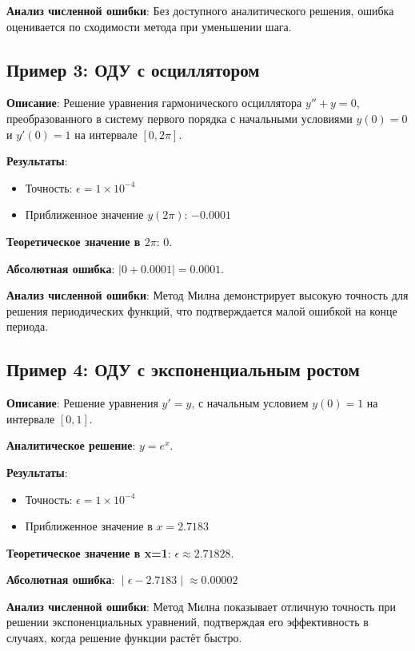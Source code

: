 \textbf{Анализ численной ошибки}: Без доступного аналитического решения, ошибка оценивается по сходимости метода при уменьшении шага.

\subsection{Пример 3: ОДУ с осциллятором}

\textbf{Описание}: Решение уравнения гармонического осциллятора \(y'' + y = 0\), преобразованного в систему первого порядка с начальными условиями \(y(0) = 0\) и \(y'(0) = 1\) на интервале \([0, 2\pi]\).

\textbf{Результаты}:
\begin{itemize}
    \item Точность: \(\epsilon = 1 \times 10^{-4}\)
    \item Приближенное значение \(y(2\pi)\): \(-0.0001\)
\end{itemize}

\textbf{Теоретическое значение в \(2\pi\)}: 0.

\textbf{Абсолютная ошибка}: \(|0 + 0.0001| = 0.0001\).

\textbf{Анализ численной ошибки}: Метод Милна демонстрирует высокую точность для решения периодических функций, что подтверждается малой ошибкой на конце периода.

\subsection{Пример 4: ОДУ с экспоненциальным ростом}

\textbf{Описание}: Решение уравнения $y′=y$, с начальным условием $y(0)=1$ на интервале $[0,1]$.

\textbf{Аналитическое решение}: $y=e^x$.

\textbf{Результаты}:
\begin{itemize}
\item Точность: $ϵ=1×10^{−4}$
\item Приближенное значение в $x=2.7183$
\end{itemize}

\textbf{Теоретическое значение в x=1}: \( \epsilon \approx 2.71828\).

\textbf{Абсолютная ошибка}: \(∣\epsilon−2.7183∣ \approx 0.00002\)

\textbf{Анализ численной ошибки}: Метод Милна показывает отличную точность при решении экспоненциальных уравнений, подтверждая его эффективность в случаях, когда решение функции растёт быстро.

